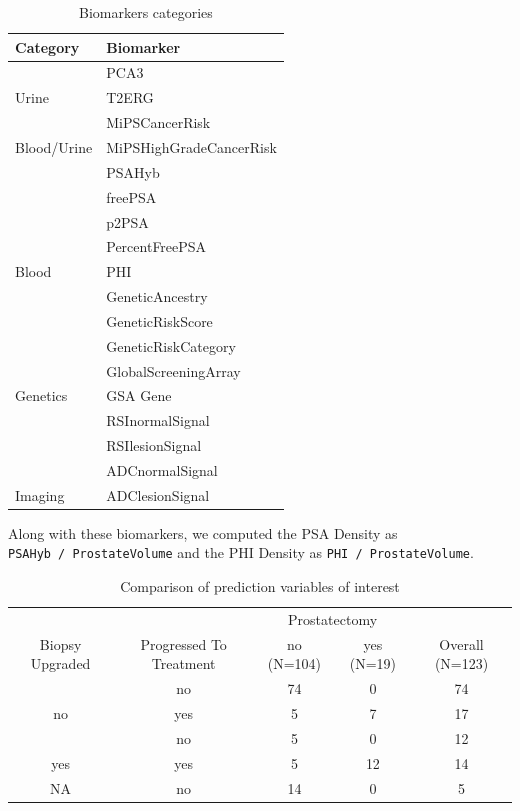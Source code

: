 \documentclass[]{article}
\begin{document}
\begin{table}

\caption{\label{tab:biomarker-categories}Biomarkers categories}
\centering
\begin{tabular}[t]{l|l}
\hline
Category & Biomarker\\
\hline
 & PCA3\\
\cline{2-2}
\multirow{-2}{*}{\raggedright\arraybackslash Urine} & T2ERG\\
\cline{1-2}
 & MiPSCancerRisk\\
\cline{2-2}
\multirow{-2}{*}{\raggedright\arraybackslash Blood/Urine} & MiPSHighGradeCancerRisk\\
\cline{1-2}
 & PSAHyb\\
\cline{2-2}
 & freePSA\\
\cline{2-2}
 & p2PSA\\
\cline{2-2}
 & PercentFreePSA\\
\cline{2-2}
\multirow{-5}{*}{\raggedright\arraybackslash Blood} & PHI\\
\cline{1-2}
 & GeneticAncestry\\
\cline{2-2}
 & GeneticRiskScore\\
\cline{2-2}
 & GeneticRiskCategory\\
\cline{2-2}
 & GlobalScreeningArray\\
\cline{2-2}
\multirow{-5}{*}{\raggedright\arraybackslash Genetics} & GSA Gene\\
\cline{1-2}
 & RSInormalSignal\\
\cline{2-2}
 & RSIlesionSignal\\
\cline{2-2}
 & ADCnormalSignal\\
\cline{2-2}
\multirow{-4}{*}{\raggedright\arraybackslash Imaging} & ADClesionSignal\\
\hline
\end{tabular}
\end{table}

Along with these biomarkers, we computed the PSA Density as \texttt{PSAHyb\ /\ ProstateVolume} and the PHI Density as \texttt{PHI\ /\ ProstateVolume}.

\begin{table}

\caption{\label{tab:prediction-vars}Comparison of prediction variables of interest}
\centering
\begin{tabular}[t]{ccccc}
\toprule
\multicolumn{2}{c}{ } & \multicolumn{2}{c}{Prostatectomy} & \multicolumn{1}{c}{ } \\
\cmidrule(l{3pt}r{3pt}){3-4}
Biopsy Upgraded & Progressed To Treatment & no (N=104) & yes (N=19) & Overall (N=123)\\
\midrule
 & no & 74 & 0 & 74\\
\cmidrule{2-5}
\multirow{-2}{*}{\centering\arraybackslash no} & yes & 5 & 7 & 17\\
\cmidrule{1-5}
 & no & 5 & 0 & 12\\
\cmidrule{2-5}
\multirow{-2}{*}{\centering\arraybackslash yes} & yes & 5 & 12 & 14\\
\cmidrule{1-5}
NA & no & 14 & 0 & 5\\
\bottomrule
\end{tabular}
\end{table}
\end{document}
